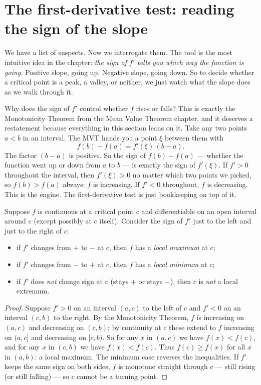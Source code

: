 \section{The first-derivative test: reading the sign of the slope}

We have a list of suspects. Now we interrogate them. The tool is the most
intuitive idea in the chapter: \emph{the sign of $f'$ tells you which way the
function is going.} Positive slope, going up. Negative slope, going down. So to
decide whether a critical point is a peak, a valley, or neither, we just watch what
the slope does as we walk through it.

\begin{whybox}
Why does the sign of $f'$ control whether $f$ rises or falls? This is exactly the
Monotonicity Theorem from the Mean Value Theorem chapter, and it deserves a
restatement because everything in this section leans on it. Take any two points
$a<b$ in an interval. The MVT hands you a point $\xi$ between them with
\[
f(b)-f(a)=f'(\xi)\,(b-a).
\]
The factor $(b-a)$ is positive. So the sign of $f(b)-f(a)$ --- whether the function
went up or down from $a$ to $b$ --- is exactly the sign of $f'(\xi)$. If $f'>0$
throughout the interval, then $f'(\xi)>0$ no matter which two points we picked, so
$f(b)>f(a)$ always: $f$ is increasing. If $f'<0$ throughout, $f$ is decreasing.
This is the engine. The first-derivative test is just bookkeeping on top of it.
\end{whybox}

\begin{theorem}\label{ch16:thm-fdt}
Suppose $f$ is continuous at a critical point $c$ and differentiable on an open
interval around $c$ (except possibly at $c$ itself). Consider the sign of $f'$ just
to the left and just to the right of $c$:
\begin{itemize}
\item if $f'$ changes from $+$ to $-$ at $c$, then $f$ has a \emph{local maximum}
at $c$;
\item if $f'$ changes from $-$ to $+$ at $c$, then $f$ has a \emph{local minimum}
at $c$;
\item if $f'$ does \emph{not} change sign at $c$ (stays $+$ or stays $-$), then $c$
is \emph{not} a local extremum.
\end{itemize}
\end{theorem}

\begin{proof}
Suppose $f'>0$ on an interval $(a,c)$ to the left of $c$ and $f'<0$ on an interval
$(c,b)$ to the right. By the Monotonicity Theorem, $f$ is increasing on $(a,c)$ and
decreasing on $(c,b)$; by continuity at $c$ these extend to $f$ increasing on
$(a,c]$ and decreasing on $[c,b)$. So for any $x$ in $(a,c)$ we have $f(x)<f(c)$,
and for any $x$ in $(c,b)$ we have $f(x)<f(c)$. Thus $f(c)\ge f(x)$ for all $x$ in
$(a,b)$: a local maximum. The minimum case reverses the inequalities. If $f'$ keeps
the same sign on both sides, $f$ is monotone straight through $c$ --- still rising
(or still falling) --- so $c$ cannot be a turning point.
\end{proof}

